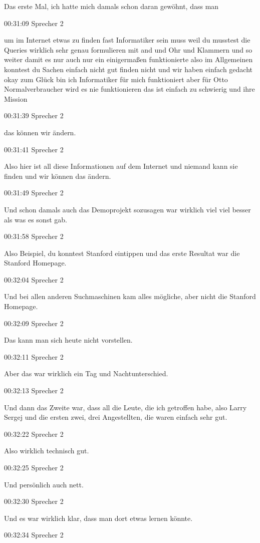 Das erste Mal, ich hatte mich damals schon daran gewöhnt, dass man

00:31:09 Sprecher 2

um im Internet etwas zu finden fast Informatiker sein muss weil du
musstest die Queries wirklich sehr genau formulieren mit and und Ohr und
Klammern und so weiter damit es nur auch nur ein einigermaßen
funktionierte also im Allgemeinen konntest du Sachen einfach nicht gut
finden nicht und wir haben einfach gedacht okay zum Glück bin ich
Informatiker für mich funktioniert aber für Otto Normalverbraucher wird
es nie funktionieren das ist einfach zu schwierig und ihre Mission

00:31:39 Sprecher 2

das können wir ändern.

00:31:41 Sprecher 2

Also hier ist all diese Informationen auf dem Internet und niemand kann
sie finden und wir können das ändern.

00:31:49 Sprecher 2

Und schon damals auch das Demoprojekt sozusagen war wirklich viel viel
besser als was es sonst gab.

00:31:58 Sprecher 2

Also Beispiel, du konntest Stanford eintippen und das erste Resultat war
die Stanford Homepage.

00:32:04 Sprecher 2

Und bei allen anderen Suchmaschinen kam alles mögliche, aber nicht die
Stanford Homepage.

00:32:09 Sprecher 2

Das kann man sich heute nicht vorstellen.

00:32:11 Sprecher 2

Aber das war wirklich ein Tag und Nachtunterschied.

00:32:13 Sprecher 2

Und dann das Zweite war, dass all die Leute, die ich getroffen habe,
also Larry Sergej und die ersten zwei, drei Angestellten, die waren
einfach sehr gut.

00:32:22 Sprecher 2

Also wirklich technisch gut.

00:32:25 Sprecher 2

Und persönlich auch nett.

00:32:30 Sprecher 2

Und es war wirklich klar, dass man dort etwas lernen könnte.

00:32:34 Sprecher 2

